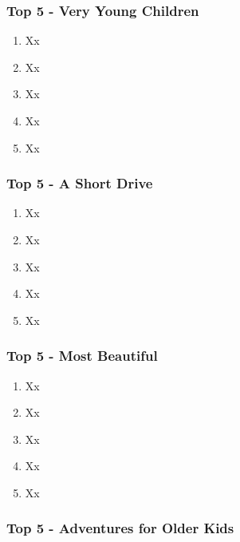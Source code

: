 \documentclass[
  letterpaper,
  DIV=11,
  numbers=noendperiod]{scrartcl}
\providecommand{\tightlist}{%
  \setlength{\itemsep}{0pt}\setlength{\parskip}{0pt}}\usepackage{longtable,booktabs,array}
\begin{document}
\hypertarget{top-5---very-young-children}{%
\subsubsection{Top 5 - Very Young
Children}\label{top-5---very-young-children}}

\begin{enumerate}
\def\labelenumi{\arabic{enumi}.}
\tightlist
\item
  Xx
\item
  Xx
\item
  Xx
\item
  Xx
\item
  Xx
\end{enumerate}

\hypertarget{top-5---a-short-drive}{%
\subsubsection{Top 5 - A Short Drive}\label{top-5---a-short-drive}}

\begin{enumerate}
\def\labelenumi{\arabic{enumi}.}
\tightlist
\item
  Xx
\item
  Xx
\item
  Xx
\item
  Xx
\item
  Xx
\end{enumerate}

\hypertarget{top-5---most-beautiful}{%
\subsubsection{Top 5 - Most Beautiful}\label{top-5---most-beautiful}}

\begin{enumerate}
\def\labelenumi{\arabic{enumi}.}
\tightlist
\item
  Xx
\item
  Xx
\item
  Xx
\item
  Xx
\item
  Xx
\end{enumerate}

\hypertarget{top-5---adventures-for-older-kids}{%
\subsubsection{Top 5 - Adventures for Older
Kids}\label{top-5---adventures-for-older-kids}}
\end{document}

